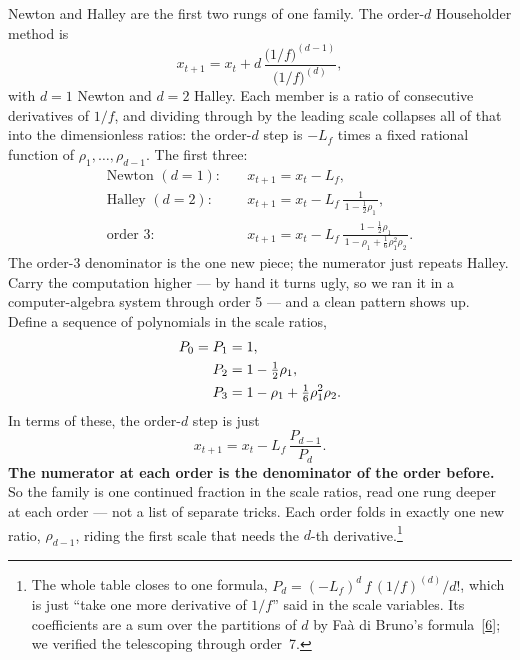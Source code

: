 \documentclass[11pt]{article}
\newcommand{\Lf}{L_{f}}                 %
\newcommand{\rr}{\rho}                  %
\newcommand{\order}{d}                  %
\begin{document}
Newton and Halley are the first two rungs of one family. The order-$\order$
Householder method is
\begin{equation}
  x_{t+1} = x_t + \order\,
            \frac{\big(1/f\big)^{(\order-1)}}{\big(1/f\big)^{(\order)}},
  \label{eq:householder}
\end{equation}
with $\order=1$ Newton and $\order=2$ Halley. Each member is a ratio of consecutive
derivatives of $1/f$, and dividing through by the leading scale collapses all of that
into the dimensionless ratios: the order-$\order$ step is $-\Lf$ times a fixed
rational function of $\rr_1,\dots,\rr_{\order-1}$. The first three:
\begin{align}
  \text{Newton } (\order=1):\quad
    & x_{t+1} = x_t - \Lf, \\[0.3em]
  \text{Halley } (\order=2):\quad
    & x_{t+1} = x_t - \Lf\,\frac{1}{\,1-\tfrac12\rr_1\,}, \\[0.3em]
  \text{order } 3:\quad
    & x_{t+1} = x_t - \Lf\,
      \frac{1-\tfrac12\rr_1}{\,1-\rr_1+\tfrac16\rr_1^{2}\rr_2\,}.
  \label{eq:order3}
\end{align}
The order-3 denominator is the one new piece; the numerator just repeats Halley.
Carry the computation higher --- by hand it turns ugly, so we ran it in a
computer-algebra system through order 5 --- and a clean pattern shows up. Define a
sequence of polynomials in the scale ratios,
\begin{align}
  P_0 = P_1 &= 1, \notag\\
  P_2 &= 1 - \tfrac12\rr_1, \notag\\
  P_3 &= 1 - \rr_1 + \tfrac16\rr_1^2\rr_2.
  \label{eq:Ppolys}
\end{align}
In terms of these, the order-$\order$ step is just
\begin{equation}
  x_{t+1} = x_t - \Lf\,\frac{P_{\order-1}}{P_\order}.
  \label{eq:hhstep}
\end{equation}
\textbf{The numerator at each order is the denominator of the order before.} So the
family is one continued fraction in the scale ratios, read one rung deeper at each
order --- not a list of separate tricks. Each order folds in exactly one new ratio,
$\rr_{\order-1}$, riding the first scale that needs the $\order$-th derivative.\footnote{%
The whole table closes to one formula, $P_\order=(-\Lf)^{\order}\,f\,(1/f)^{(\order)}/\order!$,
which is just ``take one more derivative of $1/f$'' said in the scale variables. Its
coefficients are a sum over the partitions of $\order$ by Fa\`a di Bruno's
formula~[\hyperlink{ref:6}{6}]; we verified the telescoping through order~7.}
\end{document}
